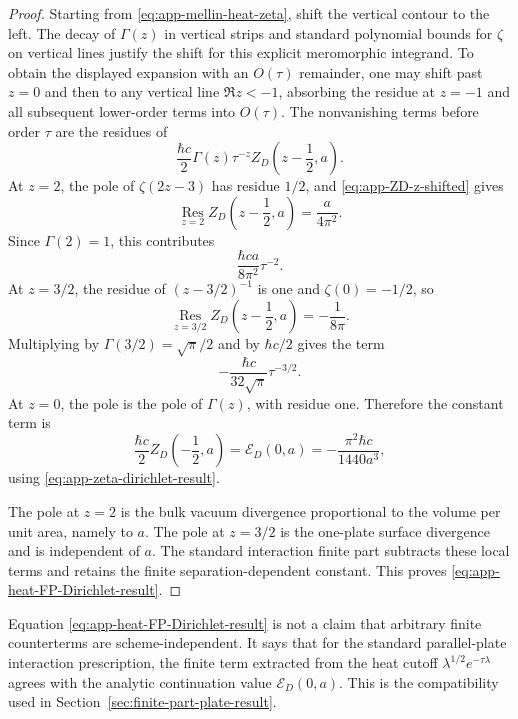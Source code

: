 \documentclass[11pt]{article}
\providecommand{\hbarc}{\hbar c}
\providecommand{\paren}[1]{\left(#1\right)}
\numberwithin{equation}{section}
\begin{document}
\begin{proof}
Starting from \eqref{eq:app-mellin-heat-zeta}, shift the vertical contour to
the left.  The decay of \(\Gamma(z)\) in vertical strips and standard polynomial
bounds for \(\zeta\) on vertical lines justify the shift for this explicit
meromorphic integrand.  To obtain the displayed expansion with an \(O(\tau)\)
remainder, one may shift past \(z=0\) and then to any vertical line
\(\Re z<-1\), absorbing the residue at \(z=-1\) and all subsequent lower-order
terms into \(O(\tau)\).  The nonvanishing terms before order \(\tau\) are the
residues of
\[
    \frac{\hbarc}{2}\Gamma(z)\tau^{-z}Z_D\paren{z-\frac12,a}.
\]
At \(z=2\), the pole of \(\zeta(2z-3)\) has residue \(1/2\), and
\eqref{eq:app-ZD-z-shifted} gives
\[
    \operatorname*{Res}_{z=2}
    Z_D\paren{z-\frac12,a}
    =
    \frac{a}{4\pi^2}.
\]
Since \(\Gamma(2)=1\), this contributes
\[
    \frac{\hbarc a}{8\pi^2}\tau^{-2}.
\]
At \(z=3/2\), the residue of \((z-3/2)^{-1}\) is one and \(\zeta(0)=-1/2\), so
\[
    \operatorname*{Res}_{z=3/2}
    Z_D\paren{z-\frac12,a}
    =
    -\frac{1}{8\pi}.
\]
Multiplying by \(\Gamma(3/2)=\sqrt\pi/2\) and by \(\hbarc/2\) gives the term
\[
    -\frac{\hbarc}{32\sqrt\pi}\tau^{-3/2}.
\]
At \(z=0\), the pole is the pole of \(\Gamma(z)\), with residue one.  Therefore
the constant term is
\[
    \frac{\hbarc}{2}Z_D\paren{-\frac12,a}
    =
    \mathcal E_D(0,a)
    =
    -\frac{\pi^2\hbarc}{1440a^3},
\]
using \eqref{eq:app-zeta-dirichlet-result}.

The pole at \(z=2\) is the bulk vacuum divergence proportional to the volume
per unit area, namely to \(a\).  The pole at \(z=3/2\) is the one-plate surface
divergence and is independent of \(a\).  The standard interaction finite part
subtracts these local terms and retains the finite separation-dependent
constant.  This proves \eqref{eq:app-heat-FP-Dirichlet-result}.
\end{proof}

\begin{remark}
\label{rem:app-heat-zeta-compatibility}
Equation \eqref{eq:app-heat-FP-Dirichlet-result} is not a claim that arbitrary
finite counterterms are scheme-independent.  It says that for the standard
parallel-plate interaction prescription, the finite term extracted from the
heat cutoff \(\lambda^{1/2}e^{-\tau\lambda}\) agrees with the analytic
continuation value \(\mathcal E_D(0,a)\).  This is the compatibility used in
Section~\ref{sec:finite-part-plate-result}.
\end{remark}
\end{document}
